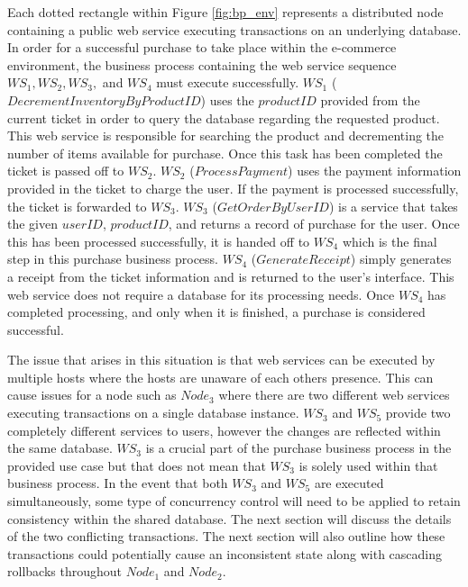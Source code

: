 \documentclass[conference]{IEEEtran}
\begin{document}
Each dotted rectangle within Figure \ref{fig:bp_env} represents a distributed node containing a public web service executing transactions on an underlying database. In order for a successful purchase to take place within the e-commerce environment, the business process containing the web service sequence $WS_{1}, WS_{2}, WS_{3},$ and $WS_{4}$ must execute successfully. $WS_{1}$ ($DecrementInventoryByProductID$) uses the $productID$ provided from the current ticket in order to query the database regarding the requested product. This web service is responsible for searching the product and decrementing the number of items available for purchase. Once this task has been completed the ticket is passed off to $WS_{2}$. $WS_{2}$ ($ProcessPayment$) uses the payment information provided in the ticket to charge the user. If the payment is processed successfully, the ticket is forwarded to $WS_{3}$. $WS_{3}$ ($GetOrderByUserID$) is a service that takes the given $userID$, $product ID$, and returns a record of purchase for the user. Once this has been processed successfully, it is handed off to $WS_{4}$ which is the final step in this purchase business process. $WS_{4}$ ($GenerateReceipt$) simply generates a receipt from the ticket information and is returned to the user's interface. This web service does not require a database for its processing needs. Once $WS_{4}$ has completed processing, and only when it is finished, a purchase is considered successful.

The issue that arises in this situation is that web services can be executed by multiple hosts where the hosts are unaware of each others presence. This can cause issues for a node such as $Node_{3}$ where there are two different web services executing transactions on a single database instance. $WS_{3}$ and $WS_{5}$ provide two completely different services to users, however the changes are reflected within the same database. $WS_{3}$ is a crucial part of the purchase business process in the provided use case but that does not mean that $WS_{3}$ is solely used within that business process. In the event that both $WS_{3}$ and $WS_{5}$ are executed simultaneously, some type of concurrency control will need to be applied to retain consistency within the shared database. The next section will discuss the details of the two conflicting transactions. The next section will also outline how these transactions could potentially cause an inconsistent state along with cascading rollbacks throughout $Node_{1}$ and $Node_{2}$.
\end{document}
